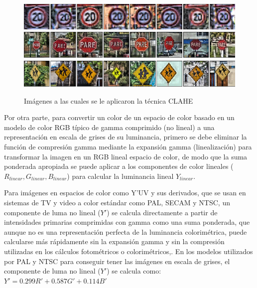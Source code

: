 			\begin{figure}[H]
			\includegraphics[width=1\textwidth]{images/desarrollo/Normalization_Processing/norm_test1}
			\includegraphics[width=1\textwidth]{images/desarrollo/Normalization_Processing/norm_test3}
			\includegraphics[width=1\textwidth]{images/desarrollo/Normalization_Processing/norm_test4}
			\begin{center}
			\caption{\small{Imágenes a las cuales se le aplicaron la técnica CLAHE }}
			
			{\small{\fontsize{10}{16.8}\selectfont {Fuente: Elaboración propia}}}
			\end{center}
			\vspace{-1.5em}
			\end{figure}
		
		Por otra parte, para convertir un color de un espacio de color basado en un modelo de color RGB típico de gamma comprimido (no lineal) a una representación en escala de grises de su luminancia, primero se debe eliminar la función de compresión gamma mediante la expansión gamma (linealización) para transformar la imagen en un RGB lineal espacio de color, de modo que la suma ponderada apropiada se puede aplicar a los componentes de color lineales ($R_{linear} , G_{linear} , B_{linear}$) para calcular la luminancia lineal $Y_{linear}$.

		Para imágenes en espacios de color como Y'UV y sus derivados, que se usan en sistemas de TV y video a color estándar como PAL, SECAM y NTSC, un componente de luma no lineal ($Y'$) se calcula directamente a partir de intensidades primarias comprimidas con gamma como una suma ponderada, que aunque no es una representación perfecta de la luminancia colorimétrica, puede calcularse más rápidamente sin la expansión gamma y sin la compresión utilizadas en los cálculos fotométricos o colorimétricos,\citep{POYNTON2003257}. En los modelos utilizados por PAL y NTSC para conseguir tener las imágenes en escala de grises, el componente de luma no lineal ($Y'$) se calcula como: \begingroup\makeatletter\def\f@size{14.8}\check@mathfonts	$Y' = 0.299R' + 0.587G' +0.114B'$ \endgroup \citep{CookJ}

